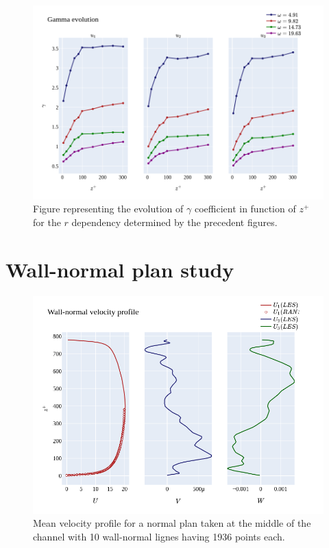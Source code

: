 \documentclass[]{article}
\theoremstyle{plain}
\theoremstyle{remark}
\begin{document}
\begin{figure}[H]
	\begin{center}
		\includegraphics[width=\textwidth]{../../output/figures/channel_wrles_retau395/split_time/gamma/gamma_view_r_all.png}
		\caption{Figure representing the evolution of $\gamma$ coefficient in function of $z^+$ for the $r$ dependency determined by the precedent figures. }
	\end{center}
\end{figure}


\section{Wall-normal plan study}

\begin{figure}[H]
	\begin{center}
		\includegraphics[width=\textwidth]{../../output/figures/channel_wrles_retau395/split_time/Normal_plan/velocity_profiles.png}
		\caption{Mean velocity profile for a normal plan taken at the middle of the channel with 10 wall-normal lignes having 1936 points each.}
	\end{center}
\end{figure}
\end{document}
